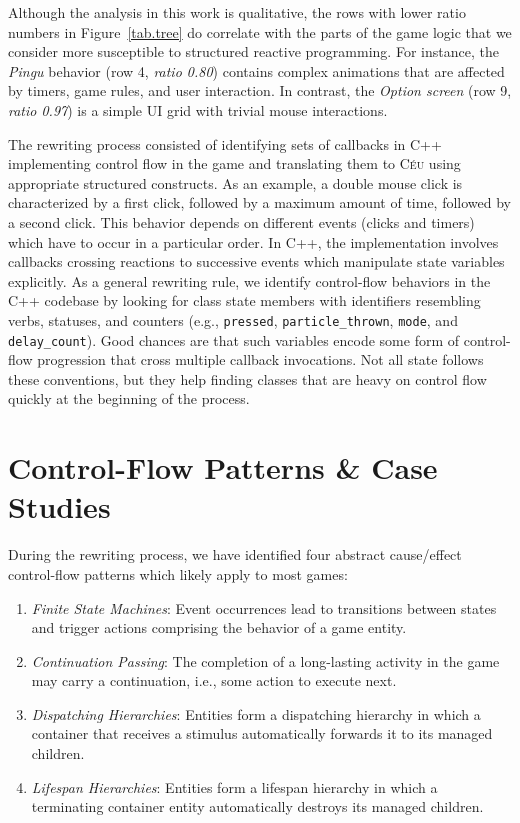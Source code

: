 \documentclass[10pt, conference, compsocconf]{IEEEtran}
\newcommand{\CEU}{\textsc{C\'{e}u}\xspace}
\newcommand{\code}[1] {{\small{\texttt{#1}}}}
\begin{document}
Although the analysis in this work is qualitative, the rows with lower ratio
numbers in Figure~\ref{tab.tree} do correlate with the parts of the game
logic that we consider more susceptible to structured reactive programming.
For instance, the \emph{Pingu} behavior (row 4, \emph{ratio 0.80}) contains
complex animations that are affected by timers, game rules, and user
interaction.
In contrast, the \emph{Option screen} (row 9, \emph{ratio 0.97}) is a simple UI
grid with trivial mouse interactions.

The rewriting process consisted of identifying sets of callbacks in C++
implementing control flow in the game and translating them to \CEU using
appropriate structured constructs.
%
As an example, a double mouse click is characterized by a first click, followed
by a maximum amount of time, followed by a second click.
This behavior depends on different events (clicks and timers) which have to
occur in a particular order.
In C++, the implementation involves callbacks crossing reactions to successive
events which manipulate state variables explicitly.
%
As a general rewriting rule, we identify control-flow behaviors in the C++
codebase by looking for class state members with identifiers resembling verbs,
statuses, and counters (e.g.,
\code{pressed},
\code{particle\_thrown},
\code{mode}, and
\code{delay\_count}).
Good chances are that such variables encode some form of control-flow
progression that cross multiple callback invocations.
%
Not all state follows these conventions, but they help finding classes that are
heavy on control flow quickly at the beginning of the process.

\section{Control-Flow Patterns \& Case Studies}
\label{sec.pats}

During the rewriting process, we have identified four abstract cause/effect
control-flow patterns which likely apply to most games:

\begin{enumerate}
\item \emph{Finite State Machines}:
    Event occurrences lead to transitions between states and trigger actions
    comprising the behavior of a game entity.
\item \emph{Continuation Passing}:
    The completion of a long-lasting activity in the game may carry a
    continuation, i.e., some action to execute next.
\item \emph{Dispatching Hierarchies}:
    Entities form a dispatching hierarchy in which a container that receives a
    stimulus automatically forwards it to its managed children.
\item \emph{Lifespan Hierarchies}:
    Entities form a lifespan hierarchy in which a terminating container entity
    automatically destroys its managed children.
\end{enumerate}
\end{document}

